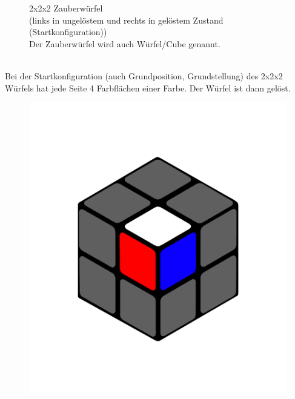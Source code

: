 \documentclass[12pt,a4paper, usenames, dvipsnames]{scrartcl}
\begin{document}
\begin{figure}[h]
\caption{2x2x2 Zauberwürfel \\ (links in ungelöstem und rechts in gelöstem Zustand (Startkonfiguration)) \\
Der Zauberwürfel wird auch Würfel/Cube genannt.}
\end{figure}
\ \\
Bei der Startkonfiguration (auch Grundposition, Grundstellung) des 2x2x2 Würfels hat jede Seite 4 Farbflächen einer Farbe. Der Würfel ist dann gelöst. \\

\begin{figure}[h]
\centering
\includegraphics[scale=0.1]{2x2stein.png}

\end{figure}
\end{document}
